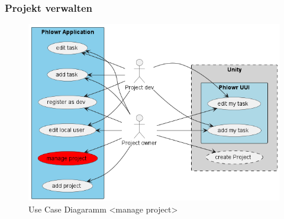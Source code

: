\subsubsection{Projekt verwalten}
\begin{figure}[H]
  \begin{center}
    \includegraphics[width=0.3\linewidth]{../content/diagrams/usecase/overview/overviewUseCaseManageProjectSelected.png}
    \caption{Use Case Diagaramm <manage project> }
  \end{center}
\end{figure}


